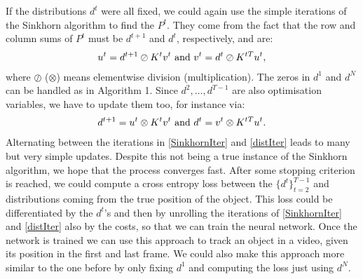\documentclass{article}
\begin{document}
{If the distributions $d^t$ were all fixed, we could again use the simple iterations of the Sinkhorn algorithm \cite{Sink67} to find the $P^t$. They come from the fact that the row and column sums of $P^t$ must be $d^{t+1}$ and $d^t$, respectively, and are:
\begin{align}\label{SinkhornIter}
u^t = d^{t+1} \oslash K^t v^t \textnormal{ and } v^t = d^t \oslash K^{tT} u^t,
\end{align}
where $\oslash$ ($\otimes$) means elementwise division (multiplication). The zeros in $d^1$ and $d^N$ can be handled as in \cite{Cut13} Algorithm 1. Since $d^2, \dots, d^{T-1}$ are also optimisation variables, we have to update them too, for instance via:
\begin{align}\label{distIter}
d^{t+1} = u^t \otimes K^t v^t \textnormal{ and } d^t = v^t \otimes K^{tT} u^t.
\end{align}
Alternating between the iterations in \eqref{SinkhornIter} and \eqref{distIter} leads to many but very simple updates. Despite this not being a true instance of the Sinkhorn algorithm, we hope that the process converges fast. After some stopping criterion is reached, we could compute a cross entropy loss between the $\{d^t\}_{t=2}^{T-1}$ and distributions coming from the true position of the object. This loss could be differentiated by the $d^t$'s and then by unrolling the iterations of \eqref{SinkhornIter} and \eqref{distIter} also by the costs, so that we can train the neural network. Once the network is trained we can use this approach to track an object in a video, given its position in the first and last frame. We could also make this approach more similar to the one before by only fixing $d^1$ and computing the loss just using $d^N$.

}
\end{document}
